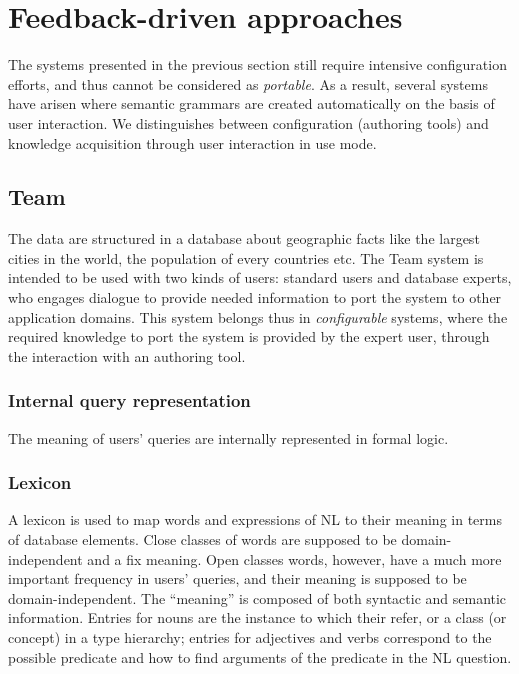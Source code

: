 \documentclass[10pt,journal,letterpaper,compsoc]{IEEEtran}
\begin{document}
\section{Feedback-driven approaches}
\label{sec:feedback-driven}

The systems presented in the previous section still require intensive
configuration efforts, and thus cannot be considered as {\it portable}.
As a result, several systems have arisen where semantic grammars are created
automatically on the basis of user interaction. We distinguishes between
configuration (authoring tools) and knowledge acquisition through user
interaction in use mode. 






\subsection{{\sc Team}~\cite{Grosz:1987:TED:25672.25674}}
The data are structured in a database about geographic facts like the largest
cities in the world, the population of every countries etc.
The {\sc Team} system is intended to be used with two kinds of users: standard
users and database experts, who engages dialogue to provide needed information
to port the system to other application domains. 
This system belongs thus in {\it configurable} systems, where the required
knowledge to port the system is provided by the expert user, through the
interaction with an authoring tool.


\subsubsection{Internal query representation}
The meaning of users' queries are internally represented in formal logic. 

\subsubsection{Lexicon}
A lexicon is used to map words and expressions of NL to their meaning in terms
of database elements. 
Close classes of words are supposed to be domain-independent and a fix meaning.
Open classes words, however, have a much more important frequency in users'
queries, and their meaning is supposed to be domain-independent. 
The ``meaning'' is composed of both syntactic and semantic information.
Entries for nouns are the instance to which their refer, or a class (or
concept) in a type hierarchy; entries for adjectives and verbs correspond to
the possible predicate and how to find arguments of the predicate in the NL
question.
\end{document}
